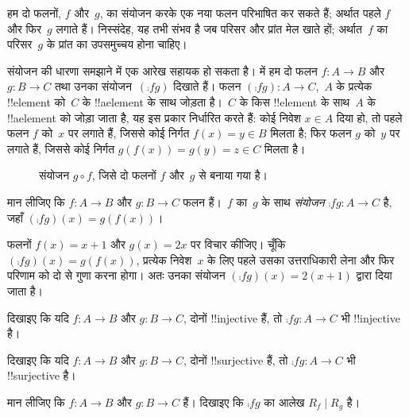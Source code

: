 \documentclass[../../../include/open-logic-section]{subfiles}
\begin{document}

\begin{explain}
 हम दो फलनों, $f$ और~$g$, का संयोजन करके
एक नया फलन परिभाषित कर सकते हैं; अर्थात पहले $f$ और फिर~$g$ लगाते हैं।
निस्संदेह, यह तभी संभव है जब परिसर और प्रांत मेल खाते हों; अर्थात~$f$ का
परिसर~$g$ के प्रांत का उपसमुच्चय होना चाहिए।

संयोजन की धारणा समझाने में एक आरेख सहायक हो सकता है।
 में हम दो फलन $f \colon A \to B$
और $g \colon B \to C$ तथा उनका संयोजन~$(\comp{f}{g})$ दिखाते हैं। फलन
$(\comp{f}{g}) \colon A \to C$,~$A$ के प्रत्येक !!{element} को~$C$ के
!!a{element} के साथ जोड़ता है।~$C$ के किस !!{element} के साथ~$A$ के
!!a{element} को जोड़ा जाता है, यह इस प्रकार निर्धारित करते हैं: कोई निवेश
$x \in
A$ दिया हो, तो पहले फलन $f$ को~$x$ पर लगाते हैं, जिससे कोई निर्गत $f(x)
= y \in B$ मिलता है; फिर फलन $g$ को~$y$ पर लगाते हैं, जिससे कोई निर्गत
$g(f(x)) = g(y) = z \in C$ मिलता है।
\begin{figure}[H]
  \caption{संयोजन $g \circ f$, जिसे दो फलनों $f$ और~$g$ से बनाया गया है।}
\end{figure}
\end{explain}

\begin{defn}[संयोजन]
मान लीजिए कि $f\colon A \to B$ और $g\colon B \to C$ फलन हैं।~$f$ का~$g$
के साथ \emph{संयोजन} $\comp{f}{g} \colon A \to C$ है, जहाँ
$(\comp{f}{g})(x) = g(f(x))$।
\end{defn}

\begin{ex}
फलनों $f(x) = x + 1$ और $g(x) = 2x$ पर विचार कीजिए। चूँकि
$(\comp{f}{g})(x) = g(f(x))$, प्रत्येक निवेश~$x$ के लिए पहले उसका
उत्तराधिकारी लेना और फिर परिणाम को दो से गुणा करना होगा। अतः उनका संयोजन
$(\comp{f}{g})(x) = 2(x+1)$ द्वारा दिया जाता है।
\end{ex}

\begin{prob}
दिखाइए कि यदि $f \colon A \to B$ और $g \colon B \to C$, दोनों
!!{injective} हैं, तो $\comp{f}{g}\colon A \to C$ भी !!{injective} है।
\end{prob}

\begin{prob}
दिखाइए कि यदि $f \colon A \to B$ और $g \colon B \to C$, दोनों
!!{surjective} हैं, तो $\comp{f}{g}\colon A \to C$ भी !!{surjective} है।
\end{prob}

\begin{prob}
मान लीजिए कि $f \colon A \to B$ और $g \colon B \to C$ हैं। दिखाइए कि
$\comp{f}{g}$ का आलेख $R_f \mid R_g$ है।
\end{prob}
\end{document}
